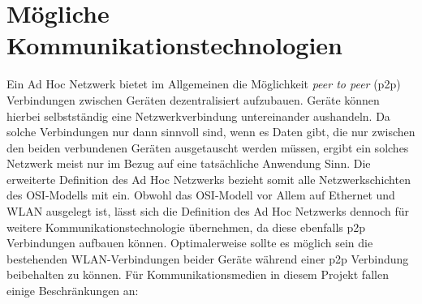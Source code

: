 \section{Mögliche Kommunikationstechnologien}
    Ein Ad Hoc Netzwerk bietet im Allgemeinen die Möglichkeit {\it peer to peer} (p2p) Verbindungen zwischen Geräten dezentralisiert aufzubauen.
    Geräte können hierbei selbstständig eine Netzwerkverbindung untereinander aushandeln. Da solche Verbindungen nur dann sinnvoll sind,
    wenn es Daten gibt, die nur zwischen den beiden verbundenen Geräten ausgetauscht werden müssen, ergibt ein solches Netzwerk meist nur
    im Bezug auf eine tatsächliche Anwendung Sinn. Die erweiterte Definition des Ad Hoc Netzwerks
    bezieht somit alle Netzwerkschichten des OSI-Modells mit ein.\cite[S.23]{Sikora}
    Obwohl das OSI-Modell vor Allem auf Ethernet und WLAN ausgelegt ist, lässt sich die Definition des Ad Hoc Netzwerks
    dennoch für weitere Kommunikationstechnologie übernehmen, da diese ebenfalls p2p Verbindungen aufbauen können.
    Optimalerweise sollte es möglich sein die bestehenden WLAN-Verbindungen beider Geräte während einer p2p Verbindung beibehalten zu können.
    Für Kommunikationsmedien in diesem Projekt fallen einige Beschränkungen an: 
